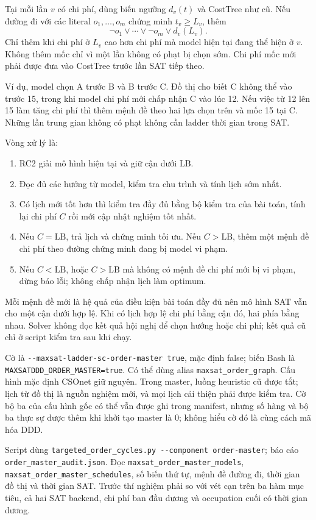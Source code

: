 \documentclass[11pt,a4paper]{article}
\newcommand{\code}[1]{\texttt{#1}}
\newcommand{\file}[1]{\nolinkurl{#1}}
\begin{document}
Tại mỗi lần $v$ có chi phí, dùng biến ngưỡng $d_v(t)$ và CostTree như cũ.
Nếu đường đi với các literal $o_1,\ldots,o_m$ chứng minh
$t_v\geq L_v$, thêm
\[
 \neg o_1\lor\cdots\lor\neg o_m\lor d_v(L_v).
\]
Chỉ thêm khi chi phí ở $L_v$ cao hơn chi phí mà model hiện tại đang thể
hiện ở $v$. Không thêm mốc chỉ vì một lần không có phạt bị chọn sớm.
Chi phí mốc mới phải được đưa vào CostTree trước lần SAT tiếp theo.

Ví dụ, model chọn A trước B và B trước C. Đồ thị cho biết C không thể vào
trước 15, trong khi model chi phí mới chấp nhận C vào lúc 12. Nếu việc từ
12 lên 15 làm tăng chi phí thì thêm mệnh đề theo hai lựa chọn trên và mốc
15 tại C. Những lần trung gian không có phạt không cần ladder thời gian
trong SAT.

Vòng xử lý là:
\begin{enumerate}
\item RC2 giải mô hình hiện tại và giữ cận dưới LB.
\item Đọc đủ các hướng từ model, kiểm tra chu trình và tính lịch sớm nhất.
\item Có lịch mới tốt hơn thì kiểm tra đầy đủ bằng bộ kiểm tra của bài
toán, tính lại chi phí $C$ rồi mới cập nhật nghiệm tốt nhất.
\item Nếu $C=\mathrm{LB}$, trả lịch và chứng minh tối ưu. Nếu $C>\mathrm{LB}$,
thêm một mệnh đề chi phí theo đường chứng minh đang bị model vi phạm.
\item Nếu $C<\mathrm{LB}$, hoặc $C>\mathrm{LB}$ mà không có mệnh đề chi phí
mới bị vi phạm, dừng báo lỗi; không chấp nhận lịch làm optimum.
\end{enumerate}

Mỗi mệnh đề mới là hệ quả của điều kiện bài toán đầy đủ nên mô hình SAT
vẫn cho một cận dưới hợp lệ. Khi có lịch hợp lệ chi phí bằng cận đó, hai
phía bằng nhau. Solver không đọc kết quả hội nghị để chọn hướng hoặc
chi phí; kết quả cũ chỉ ở script kiểm tra sau khi chạy.

Cờ là \file{--maxsat-ladder-sc-order-master true}, mặc định false;
biến Bash là \file{MAXSATDDD_ORDER_MASTER=true}. Có thể dùng alias
\code{maxsat\_order\_graph}. Cấu hình mặc định CSOnet giữ nguyên.
Trong master, luồng heuristic cũ được tắt; lịch từ đồ thị là nguồn nghiệm
mới, và mọi lịch cải thiện phải được kiểm tra. Cờ bộ ba của cấu hình gốc
có thể vẫn được ghi trong manifest, nhưng số hàng và bộ ba thực sự được
thêm khi khởi tạo master là 0; không hiểu cờ đó là cùng cách mã hóa DDD.

Script dùng \file{targeted_order_cycles.py --component order-master};
báo cáo \file{order_master_audit.json}. Đọc
\file{maxsat_order_master_models}, \file{maxsat_order_master_schedules},
số biến thứ tự, mệnh đề đường đi, thời gian đồ thị và thời gian SAT.
Trước thí nghiệm phải so với vét cạn trên ba hàm mục tiêu, cả hai SAT
backend, chi phí ban đầu dương và occupation cuối có thời gian dương.
\end{document}
